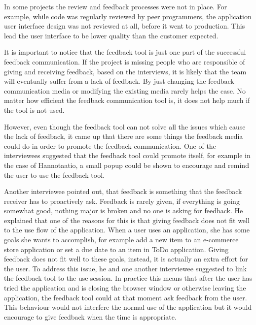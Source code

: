 \documentclass[english,12pt,a4paper,pdftex]{article}
\begin{document}
In some projects the review and feedback processes were not in place. For example, while code was regularly reviewed by peer programmers, the application user interface design was not reviewed at all, before it went to production. This lead the user interface to be lower quality than the customer expected.

It is important to notice that the feedback tool is just one part of the successful feedback communication. If the project is missing people who are responsible of giving and receiving feedback, based on the interviews, it is likely that the team will eventually suffer from a lack of feedback. By just changing the feedback communication media or modifying the existing media rarely helps the case. No matter how efficient the feedback communication tool is, it does not help much if the tool is not used.

However, even though the feedback tool can not solve all the issues which cause the lack of feedback, it came up that there are some things the feedback media could do in order to promote the feedback communication. One of the interviewees suggested that the feedback tool could promote itself, for example in the case of Hannotaatio, a small popup could be shown to encourage and remind the user to use the feedback tool. 

Another interviewee pointed out, that feedback is something that the feedback receiver has to proactively ask. Feedback is rarely given, if everything is going somewhat good, nothing major is broken and no one is asking for feedback. He explained that one of the reasons for this is that giving feedback does not fit well to the use flow of the application. When a user uses an application, she has some goals she wants to accomplish, for example add a new item to an e-commerce store application or set a due date to an item in ToDo application. Giving feedback does not fit well to these goals, instead, it is actually an extra effort for the user. To address this issue, he and one another interviewee suggested to link the feedback tool to the use session. In practice this means that after the user has tried the application and is closing the browser window or otherwise leaving the application, the feedback tool could at that moment ask feedback from the user. This behaviour would not interfere the normal use of the application but it would encourage to give feedback when the time is appropriate. 

\end{document}
